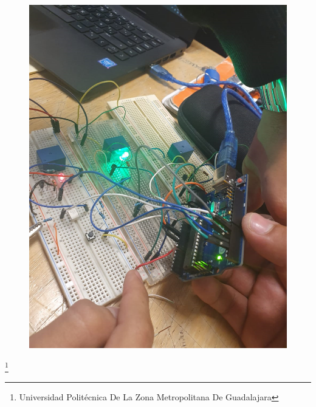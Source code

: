\documentclass[11pt,a4paper]{article}
\begin{document}
\begin{figure}[hbtp]
\centering
\includegraphics[scale=0.25]{003.png} 
\end{figure}

\footnote{Universidad Politécnica De La Zona Metropolitana De Guadalajara}
\newpage
\end{document}
